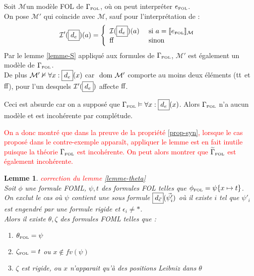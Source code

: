 \documentclass[12pt]{article}
\newcommand{\FOL}{\ensuremath{\textup{\tiny{}FOL}}}
\newcommand{\false}{\textup{ff}}
\newcommand{\true}{\textup{tt}}
\newcommand{\M}{\ensuremath{\mathcal{M}}}
\newcommand{\I}{\ensuremath{\mathcal{I}}}
\newcommand{\dom}{\ensuremath{\textup{ dom }}}
\newcommand{\raph}[1]{\textcolor{red}{#1}}
\newtheorem{lem}{Lemme}
\begin{document}
Soit \M un modèle FOL de $\Gamma_\FOL$, où on peut interpréter $e_\FOL$.\\
On pose $\M'$ qui coincide avec \M, sauf pour l'interprétation de  :
\[ \I'(\framebox{$d_e$})(a) =
  \left \{
    \begin{array}{l l}
      \I(\framebox{$d_e$})(a) & \textup{ si } a = \llbracket e_\FOL \rrbracket_\M \\
      \false & \textup{ sinon }
    \end{array}
  \right . \]
Par le lemme \ref{lemme-S} appliqué aux formules de $\Gamma_\FOL$, $\M'$ est également un modèle de $\Gamma_\FOL$. \\
De plus \(\M' \nvDash \forall x : \framebox{$d_e$}(x)\) car $\dom \M'$ comporte au moins deux éléments ($\true$ et $\false$), pour l'un desquels \(\I'(\framebox{$d_e$})\) affecte $\false$.

Ceci est absurde car on a supposé que \(\Gamma_\FOL \vDash \forall x : \framebox{$d_e$}(x)\).
Alors $\Gamma_\FOL$ n'a aucun modèle et est incohérente par complétude.

\vspace{1cm}

\raph{%
  On a donc montré que dans la preuve de la propriété \ref{prop-syn},
  lorsque le cas proposé dans le contre-exemple apparaît,
  appliquer le lemme est en fait inutile puisque la théorie $\Gamma_\FOL$ est incohérente.
  On peut alors montrer que $\widetilde{\Gamma}_\FOL$ est également incohérente.}

\begin{lem}
  \label{lemme-theta-corr}
  \raph{correction du lemme \ref{lemme-theta}}\\
  Soit $\phi$ une formule FOML, $\psi, t$ des formules FOL telles que $\phi_\FOL = \psi\{x \mapsto t\}$.\\
  On exclut le cas où $\psi$ contient une sous formule \(\framebox{$d_{\vec{\epsilon}}$}(\vec{\psi'_i})\)
  où il existe $i$ tel que $\psi'_i$ est engendré par une formule rigide et $\epsilon_i \neq *$. \\
  Alors il existe $\theta, \zeta$ des formules FOML telles que :
  \begin{enumerate}
  \item
    $\theta_\FOL = \psi$
  \item
    $\zeta_\FOL = t$ ou $x \notin fv(\psi)$
  \item
    $\zeta$ est rigide, ou $x$ n'apparait qu'à des positions Leibniz dans $\theta$
  \end{enumerate}
\end{lem}
\end{document}
